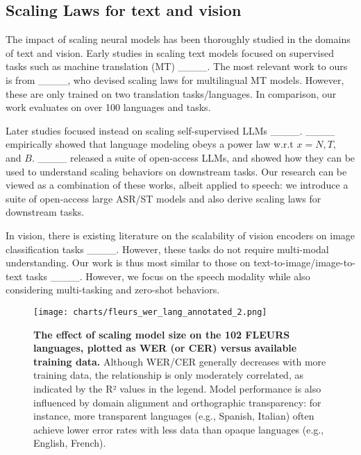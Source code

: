 \vspace{-0.2cm}
\subsection{Scaling Laws for text and vision}
\vspace{-0.2cm}

The impact of scaling neural models has been thoroughly studied in the domains of text and vision. Early studies in scaling text models focused on supervised tasks such as machine translation (MT) ____. The most relevant work to ours is from ____, who devised scaling laws for multilingual MT models. However, these are only trained on two translation tasks/languages. In comparison, our work evaluates on over 100 languages and tasks.

Later studies focused instead on scaling self-supervised LLMs ____. ____ empirically showed that language modeling obeys a power law w.r.t $x = N, T,$ and $B$. ____ released a suite of open-access LLMs, and showed how they can be used to understand scaling behaviors on downstream tasks. Our research can be viewed as a combination of these works, albeit applied to speech: we introduce a suite of open-access large ASR/ST models and also derive scaling laws for downstream tasks.

In vision, there is existing literature on the scalability of vision encoders on image classification tasks ____. However, these tasks do not require multi-modal understanding. Our work is thus most similar to those on text-to-image/image-to-text tasks ____. However, we focus on the speech modality while also considering multi-tasking and zero-shot behaviors.

\begin{figure*}
    \centering
    \texttt{[image: charts/fleurs\_wer\_lang\_annotated\_2.png]}
    \vspace{-0.3cm}
    \caption{
    \textbf{The effect of scaling model size on the 102 FLEURS languages, plotted as WER (or CER) versus available training data.} Although WER/CER generally decreases with more training data, the relationship is only moderately correlated, as indicated by the R² values in the legend. Model performance is also influenced by domain alignment and orthographic transparency: for instance, more transparent languages (e.g., Spanish, Italian) often achieve lower error rates with less data than opaque languages (e.g., English, French).
    }
    \vspace{-0.3cm}
    \label{fig:multilingual_param}
\end{figure*}
\vspace{-0.1cm}
